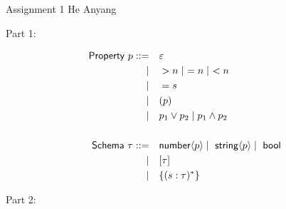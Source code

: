 \documentclass[11pt]{article}
\newcommand{\prop}[1]{\langle{#1}\rangle}%
\begin{document}
\hwtitle
{Assignment 1}
{He Anyang} %


Part 1:

\begin{alignat*}{1}
  \msf{Property}~p ::= \qamp \varepsilon                                       \\
  \mid \qamp >n \mid\ =n \mid\ <n                                              \\
  \mid \qamp =s                                                                \\
  \mid \qamp (p)                                                               \\
  \mid \qamp p_1 \vee p_2 \mid p_1 \wedge p_2                                  \\
  \\
  \msf{Schema}~\tau ::= \qamp \tnum \prop{p} \mid\ \tstr \prop{p} \mid\ \tbool \\
  \mid \qamp [\tau]                                                            \\
  \mid \qamp \{(s:\tau)^*\}                                                    \\
\end{alignat*}

Part 2:
\end{document}
